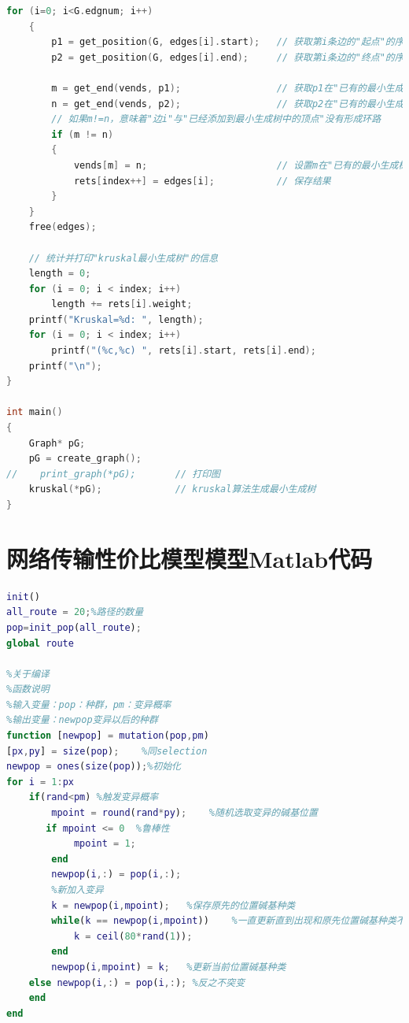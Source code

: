 \documentclass[UTF8,12pt]{ctexart}
\begin{document}
\begin{appendices}
\begin{scriptsize}
\begin{lstlisting}[language=c++]
    for (i=0; i<G.edgnum; i++)
    {
        p1 = get_position(G, edges[i].start);   // 获取第i条边的"起点"的序号
        p2 = get_position(G, edges[i].end);     // 获取第i条边的"终点"的序号

        m = get_end(vends, p1);                 // 获取p1在"已有的最小生成树"中的终点
        n = get_end(vends, p2);                 // 获取p2在"已有的最小生成树"中的终点
        // 如果m!=n，意味着"边i"与"已经添加到最小生成树中的顶点"没有形成环路
        if (m != n)
        {
            vends[m] = n;                       // 设置m在"已有的最小生成树"中的终点为n
            rets[index++] = edges[i];           // 保存结果
        }
    }
    free(edges);

    // 统计并打印"kruskal最小生成树"的信息
    length = 0;
    for (i = 0; i < index; i++)
        length += rets[i].weight;
    printf("Kruskal=%d: ", length);
    for (i = 0; i < index; i++)
        printf("(%c,%c) ", rets[i].start, rets[i].end);
    printf("\n");
}

int main()
{
    Graph* pG;
    pG = create_graph();
//    print_graph(*pG);       // 打印图
    kruskal(*pG);             // kruskal算法生成最小生成树
}

\end{lstlisting}
    \end{scriptsize}

    \section{网络传输性价比模型模型Matlab代码}
    \begin{scriptsize}
        \begin{lstlisting}[language=Matlab]
            init()
all_route = 20;%路径的数量
pop=init_pop(all_route);
global route

%关于编译
%函数说明
%输入变量：pop：种群，pm：变异概率
%输出变量：newpop变异以后的种群
function [newpop] = mutation(pop,pm)
[px,py] = size(pop);    %同selection
newpop = ones(size(pop));%初始化
for i = 1:px
    if(rand<pm) %触发变异概率
        mpoint = round(rand*py);    %随机选取变异的碱基位置
       if mpoint <= 0  %鲁棒性
            mpoint = 1;
        end
        newpop(i,:) = pop(i,:);
        %新加入变异
        k = newpop(i,mpoint);   %保存原先的位置碱基种类
        while(k == newpop(i,mpoint))    %一直更新直到出现和原先位置碱基种类不一样的情况
            k = ceil(80*rand(1));
        end
        newpop(i,mpoint) = k;   %更新当前位置碱基种类
    else newpop(i,:) = pop(i,:); %反之不突变
    end
end


\end{lstlisting}
\end{scriptsize}
\end{appendices}
\end{document}
